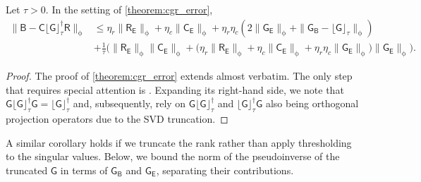 \documentclass[onefignum,onetabnum]{siamart250211}
\newcommand{\Batrix}[1]{\bm{\Matrix{#1}}}
\newcommand{\Matrix}[1]{\mathsf{#1}}
\newcommand{\pinv}{\dagger}
\newcommand{\truncate}[3][]{#1\lfloor #2 #1\rfloor_{#3}}
\newcommand{\Norm}[3][]{#1\| #2 #1\|_{\mathrm{#3}}}
\begin{document}
\begin{corollary}
\label{corollary:cgr_error_tau}
Let $\tau > 0$.
In the setting of \cref{theorem:cgr_error},
\begin{align*}
    \Norm{\Batrix{B} - \Batrix{C} \truncate{\Batrix{G}}{\tau}^\pinv \Batrix{R}}{\phi} &\leq \eta_r \Norm{\Batrix{R}_{\Batrix{E}}}{\phi} + \eta_c \Norm{\Batrix{C}_{\Batrix{E}}}{\phi} + \eta_r \eta_c (2 \Norm{\Batrix{G}_{\Batrix{E}}}{\phi} + \Norm{\Batrix{G}_{\Batrix{B}} - \truncate{\Batrix{G}}{\tau}}{\phi}) \\
    &+ \frac{1}{\tau} \Big( \Norm{\Batrix{R}_{\Batrix{E}}}{\phi} \Norm{\Batrix{C}_{\Batrix{E}}}{\phi} + \big(\eta_r \Norm{\Batrix{R}_{\Batrix{E}}}{\phi} + \eta_c \Norm{\Batrix{C}_{\Batrix{E}}}{\phi} + \eta_r \eta_c \Norm{\Batrix{G}_{\Batrix{E}}}{\phi}\big) \Norm{\Batrix{G}_{\Batrix{E}}}{\phi} \Big).
\end{align*}
\end{corollary}
\begin{proof}
The proof of \cref{theorem:cgr_error} extends almost verbatim.
The only step that requires special attention is .
Expanding its right-hand side, we note that $\Batrix{G} \truncate{\Batrix{G}}{\tau}^\pinv \Batrix{G} = \truncate{\Batrix{G}}{\tau}^\pinv$ and, subsequently, rely on $\Batrix{G} \truncate{\Batrix{G}}{\tau}^\pinv$ and $\truncate{\Batrix{G}}{\tau}^\pinv \Batrix{G}$ also being orthogonal projection operators due to the SVD truncation.
\end{proof}

A similar corollary holds if we truncate the rank rather than apply thresholding to the singular values.
Below, we bound the norm of the pseudoinverse of the truncated $\Batrix{G}$ in terms of $\Batrix{G}_{\Batrix{B}}$ and $\Batrix{G}_{\Batrix{E}}$, separating their contributions.
\end{document}
